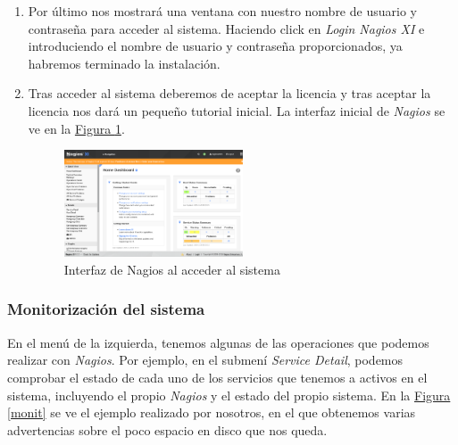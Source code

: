 \documentclass[10pt,a4paper,spanish]{article}
\numberwithin{equation}{section} %
\numberwithin{figure}{section} %
\numberwithin{table}{section} %
\begin{document}
\begin{enumerate}[1.]
    \item Por último nos mostrará una ventana con nuestro nombre de usuario y contraseña para acceder al sistema. Haciendo click en \textit{Login Nagios XI} e introduciendo el nombre de usuario y contraseña proporcionados, ya habremos terminado la instalación.

    \item Tras acceder al sistema deberemos de aceptar la licencia y tras aceptar la licencia nos dará un pequeño tutorial inicial. La interfaz inicial de \textit{Nagios} se ve en la \hyperref[interfaznagios]{Figura \ref*{interfaznagios}}.

    \begin{figure}[!h]
        \centering
        \includegraphics[width=0.5\textwidth]{3_31}
        \caption{Interfaz de Nagios al acceder al sistema}
        \label{interfaznagios}
    \end{figure}
\end{enumerate}

\subsubsection{Monitorización del sistema}
En el menú de la izquierda, tenemos algunas de las operaciones que podemos realizar con \textit{Nagios}. Por ejemplo, en el submení \textit{Service Detail}, podemos comprobar el estado de cada uno de los servicios que tenemos a activos en el sistema, incluyendo el propio \textit{Nagios} y el estado del propio sistema. En la \hyperref[monit]{Figura \ref*{monit}} se ve el ejemplo realizado por nosotros, en el que obtenemos varias advertencias sobre el poco espacio en disco que nos queda.
\end{document}
